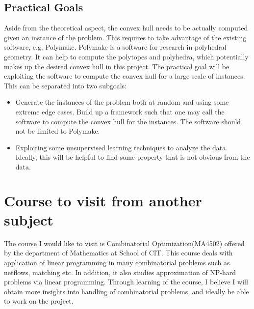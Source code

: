 \documentclass[12pt,letterpaper]{article}
\begin{document}
\subsection{Practical Goals}
Aside from the theoretical aspect, the convex hull needs to be actually computed given an instance of the problem. 
This requires to take advantage of the existing software, e.g. Polymake. Polymake is a software for research in polyhedral geometry.
It can help to compute the polytopes and polyhedra, which potentially makes up the desired convex hull in this project. 
The practical goal will be exploiting the software to compute the convex hull for a large scale of instances. 
This can be separated into two subgoals:
\begin{itemize}
    \item Generate the instances of the problem both at random and using some extreme edge cases. Build up a framework such that one 
    may call the software to compute the convex hull for the instances. The software should not be limited to Polymake. 
    \item Exploiting some unsupervised learning techniques to analyze the data. Ideally, this will be helpful to find some property 
    that is not obvious from the data.
\end{itemize}

\section{Course to visit from another subject}
The course I would like to visit is Combinatorial Optimization(MA4502) offered by the department of Mathematics at School of CIT.
This course deals with application of linear programming in many combinatorial problems such as netflows, matching etc. 
In addition, it also studies approximation of NP-hard problems via linear programming. Through learning of the course, 
I believe I will obtain more insights into handling of combinatorial problems, and ideally be able to work on the project. 
\end{document}
